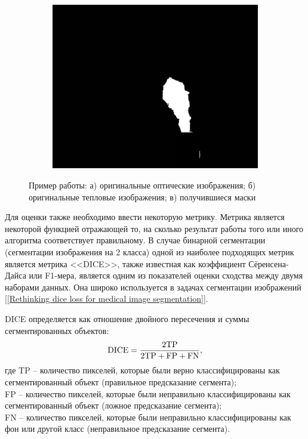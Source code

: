 \documentclass[14pt, a4paper]{extreport}
\begin{document}
\begin{figure}[h!]
\begin{subfigure}{.32\textwidth}
			\includegraphics[width = \textwidth]{image/chapter_3/examples/mask/240}
			\caption{}
		\end{subfigure}
		\caption{Пример работы: а) оригинальные оптические изображения; б) оригинальные тепловые изображения; в) получившиеся маски}
		\label{fig:test_segm}
	\end{figure}

	Для оценки также необходимо ввести некоторую метрику. Метрика является некоторой функцией отражающей то, на сколько результат работы того или иного алгоритма соответствует правильному. В случае бинарной сегментации (сегментации изображения на 2 класса) одной из наиболее подходящих метрик является метрика <<DICE>>, также известная как коэффициент Сёренсена-Дайса или F1-мера, является одним из показателей оценки сходства между двумя наборами данных. Она широко используется в задачах сегментации изображений [\ref{Rethinking dice loss for medical image segmentation}].
	
	DICE определяется как отношение двойного пересечения и суммы сегментированных объектов:
	\begin{equation}
		\textup{DICE} = \frac{2\textup{TP}}{2\textup{TP} + \textup{FP} + \textup{FN}},
		\label{eq:DiceLoss}
	\end{equation}
	где TP -- количество пикселей, которые были верно классифицированы как сегментированный объект (правильное предсказание сегмента);\\
	\hspace*{0.8cm}FP -- количество пикселей, которые были неправильно классифицированы как сегментированный объект (ложное предсказание сегмента);\\
	\hspace*{0.8cm}FN -- количество пикселей, которые были неправильно классифицированы как фон или другой класс (неправильное предсказание сегмента).
	
\end{document}
